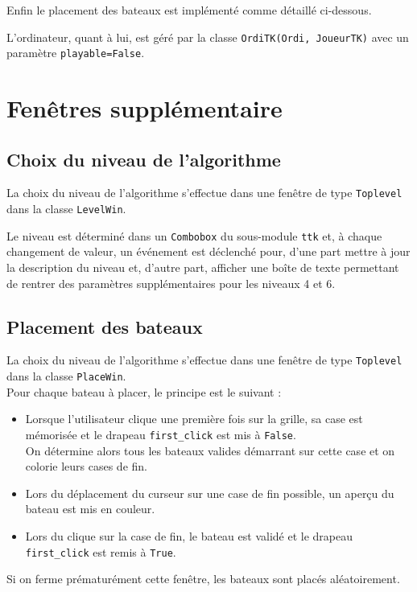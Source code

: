 Enfin le placement des bateaux est implémenté comme détaillé ci-dessous.

\medskip

L'ordinateur, quant à lui, est géré par la classe \texttt{OrdiTK(Ordi, JoueurTK)} avec un paramètre \texttt{playable=False}.

\section{Fenêtres supplémentaire}
\subsection{Choix du niveau de l'algorithme}
La choix du niveau de l'algorithme s'effectue dans une fenêtre de type \texttt{Toplevel} dans la classe \texttt{LevelWin}.

Le niveau est déterminé dans un \texttt{Combobox} du sous-module \texttt{ttk} et, à chaque changement de valeur, un événement est déclenché pour, d'une part mettre à jour la description du niveau et, d'autre part, afficher une boîte de texte permettant de rentrer des paramètres supplémentaires pour les niveaux 4 et 6.

\subsection{Placement des bateaux}
La choix du niveau de l'algorithme s'effectue dans une fenêtre de type \texttt{Toplevel} dans la classe \texttt{PlaceWin}.\\
Pour chaque bateau à placer, le principe est le suivant :
\begin{itemize}
\item Lorsque l'utilisateur clique une première fois sur la grille, sa case est mémorisée et le drapeau \texttt{first\_click} est mis à \texttt{False}.\\
On détermine alors tous les bateaux valides démarrant sur cette case et on colorie leurs cases de fin.
\item  Lors du déplacement du curseur sur une case de fin possible, un aperçu du bateau est mis en couleur.
\item Lors du clique sur la case de fin, le bateau est validé et le drapeau \texttt{first\_click} est remis à \texttt{True}.
\end{itemize}
Si on ferme prématurément cette fenêtre, les bateaux sont placés aléatoirement.
